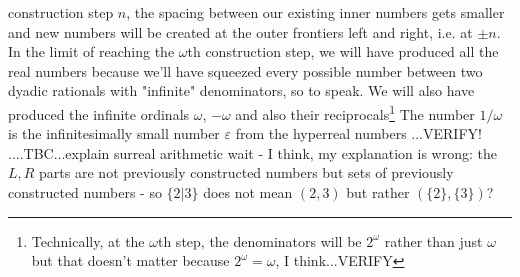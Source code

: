 construction step $n$, the spacing between our existing inner numbers gets smaller and new numbers will be created at the outer frontiers left and right, i.e. at $\pm n$. In the limit of reaching the $\omega$th construction step, we will have produced all the real numbers because we'll have squeezed every possible number between two dyadic rationals with "infinite" denominators, so to speak. We will also have produced the infinite ordinals $\omega$, $-\omega$ and also their reciprocals\footnote{Technically, at the $\omega$th step, the denominators will be $2^\omega$ rather than just $\omega$ but that doesn't matter because $2^\omega = \omega$, I think...VERIFY} The number $1/\omega$ is the infinitesimally small number $\varepsilon$ from the hyperreal numbers ...VERIFY! ....TBC...explain surreal arithmetic  wait - I think, my explanation is wrong: the $L,R$ parts are not previously constructed numbers but sets of previously constructed numbers - so $\{2|3\}$ does not mean $(2,3)$ but rather $(\{2\},\{3\})$?












